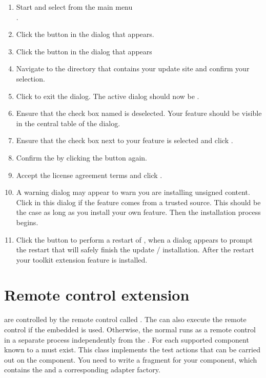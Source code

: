 \begin{enumerate}
\item Start \app{} and select from the main menu\\
.
\item Click the 
button in the  dialog that appears.
\item Click the  button in the  dialog
that appears
\item Navigate to the directory that contains your update site and confirm your
selection.
\item Click  to exit the  dialog.
 The active dialog should now be .
\item Ensure that the check box named  is
deselected. Your feature should be visible in the central table of the dialog.
\item Ensure that the check box next to your feature is selected and click
 .
\item Confirm the  by clicking the 
 button again.
\item Accept the license agreement terms and click .
\item A warning dialog may appear to warn you are installing unsigned content.
 Click  in this dialog if the feature comes from a trusted
 source. This should be the case as long as you install your own feature.
 Then the installation process begins.
\item Click the  button to perform a restart of \app{},
 when a dialog appears to prompt the restart that will safely
 finish the update / installation.  After the restart your \ite{} toolkit extension
 feature is installed.
\end{enumerate}

\section{Remote control extension}
\label{remoteControlExtension}

\gdauts{} are controlled by the remote control called \gdagent. The \ite{}
can also execute the remote control if the embedded \gdagent{}  is
used. Otherwise, the normal \gdagent{} runs as a remote control in a
separate process independently from the \ite{}.
For each supported component known to \app{} a \gdtesterclass must exist.
This class implements the test actions that can be carried out on the component.
You need to write a fragment for your component, which contains the
\gdtesterclass and a corresponding adapter factory.

